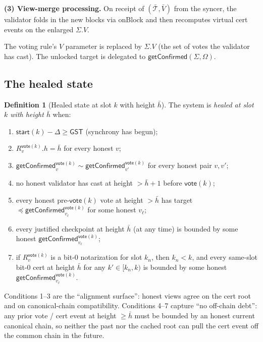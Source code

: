 \documentclass{article}
\newcommand{\T}{\ensuremath{\mathcal{T}}}
\newcommand{\start}{\mathsf{start}}
\newcommand{\vote}{\mathsf{vote}}
\newcommand{\GST}{\ensuremath{\mathsf{GST}}}
\newcommand{\onBlock}{\textsf{onBlock}\xspace}
\newcommand{\getConfirmed}{\textsf{getConfirmed}\xspace}
\newcommand{\comm}[1]{\bar{#1}}
\theoremstyle{plain}
\theoremstyle{definition}
\newtheorem{definition}[theorem]{Definition}
\theoremstyle{remark}
\renewcommand{\paragraph}[1]{\vspace{6pt}\noindent\textbf{#1}}
\begin{document}
\paragraph{(3) View-merge processing.} On receipt of $(\comm{\T}, \comm{V})$ from the syncer, the validator folds in the new blocks via \onBlock and then recomputes virtual cert events on the enlarged $\Sigma.V$.

The voting rule's $V$ parameter is replaced by $\Sigma.V$ (the set of votes the validator has cast). The unlocked target is delegated to $\getConfirmed(\Sigma, \Omega)$.

\subsection{The healed state}

\begin{definition}[Healed state at slot $k$ with height $\comm{h}$]\label{def:healed-state}
The system is \emph{healed at slot $k$ with height $\comm{h}$} when:
\begin{enumerate}
\item $\start(k) - \Delta \geq \GST$ (synchrony has begun);
\item $R_v^{\vote(k)}.h = \comm{h}$ for every honest $v$;
\item $\getConfirmed_v^{\vote(k)} \sim \getConfirmed_{v'}^{\vote(k)}$ for every honest pair $v, v'$;
\item no honest validator has cast at height $> \comm{h}+1$ before $\vote(k)$;
\item every honest pre-$\vote(k)$ vote at height $> \comm{h}$ has target $\preceq \getConfirmed_{v_\ell}^{\vote(k)}$ for some honest $v_\ell$;
\item every justified checkpoint at height $\comm{h}$ (at any time) is bounded by some honest $\getConfirmed_{v_\ell}^{\vote(k)}$;
\item if $R_v^{\vote(k)}$ is a bit-0 notarization for slot $k_n$, then $k_n < k$, and every same-slot bit-0 cert at height $\comm{h}$ for any $k' \in [k_n, k)$ is bounded by some honest $\getConfirmed_{v_\ell}^{\vote(k)}$.
\end{enumerate}
\end{definition}

\begin{intuition}
Conditions 1--3 are the ``alignment surface'': honest views agree on the cert root and on canonical-chain compatibility. Conditions 4--7 capture ``no off-chain debt'': any prior vote / cert event at height $\geq \comm{h}$ must be bounded by an honest current canonical chain, so neither the past nor the cached root can pull the cert event off the common chain in the future.
\end{intuition}
\end{document}
